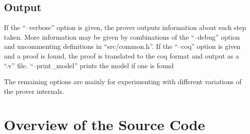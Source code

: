 \documentclass{report}
\begin{document}
\subsection{Output}
If the ``--verbose'' option is given, the prover outputs information about each step taken. More information may be given by combinations of the ``--debug'' option and uncommenting definitions in ``src/common.h''. 
If the ``--coq'' option is given and a proof is found, the proof is translated to the coq format and output as a ``.v'' file. ``--print_model'' prints the model if one is found

The remaining options are mainly for experimenting with different variations of the prover internals. 
\section{Overview of the Source Code}
\end{document}
